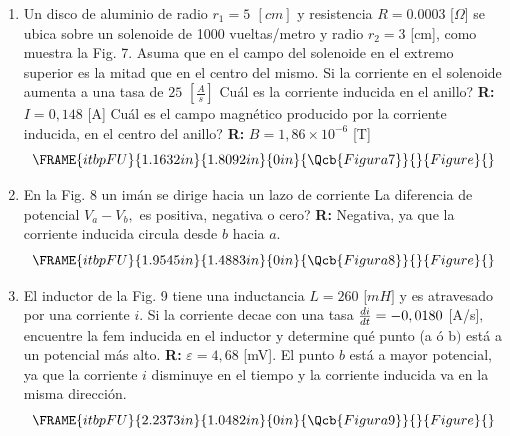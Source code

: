 \documentclass[12pt]{article}
\begin{document}
\begin{enumerate}
\item Un disco de aluminio de radio $r_{1}=5\,\ [cm]$ y resistencia $%
R=0.0003 $ [$\Omega $] se ubica sobre un solenoide de 1000 vueltas/metro y
radio $r_{2}=3$ [cm], como muestra la Fig. 7. Asuma que en el campo del
solenoide en el extremo superior es la mitad que en el centro del mismo. Si
la corriente en el solenoide aumenta a una tasa de $25$ $[\frac{A}{s}]$ 
\textquestiondown Cu\'{a}l es la corriente inducida en el anillo? \textbf{R: 
}$I=0,148$ [A] \textquestiondown Cu\'{a}l es el campo magn\'{e}tico
producido por la corriente inducida, en el centro del anillo? \textbf{R: }$%
B=1,86\times 10^{-6}$ [T]%
\begin{equation*}
\FRAME{itbpFU}{1.1632in}{1.8092in}{0in}{\Qcb{Figura 7}}{}{Figure}{\special%
{language "Scientific Word";type "GRAPHIC";maintain-aspect-ratio
TRUE;display "USEDEF";valid_file "T";width 1.1632in;height 1.8092in;depth
0in;original-width 3.5959in;original-height 5.6109in;cropleft "0";croptop
"1";cropright "1";cropbottom "0";tempfilename
'R45S6607.wmf';tempfile-properties "XPR";}}
\end{equation*}

\item En la Fig. 8 un im\'{a}n se dirige hacia un lazo de corriente 
\textquestiondown La diferencia de potencial $V_{a}-V_{b},$ es positiva,
negativa o cero? \textbf{R: }Negativa, ya que la corriente inducida circula
desde $b$ hacia $a.$%
\begin{equation*}
\FRAME{itbpFU}{1.9545in}{1.4883in}{0in}{\Qcb{Figura 8}}{}{Figure}{\special%
{language "Scientific Word";type "GRAPHIC";maintain-aspect-ratio
TRUE;display "USEDEF";valid_file "T";width 1.9545in;height 1.4883in;depth
0in;original-width 6.3728in;original-height 4.8473in;cropleft "0";croptop
"1";cropright "1";cropbottom "0";tempfilename
'R45S6608.wmf';tempfile-properties "XPR";}}
\end{equation*}

\item El inductor de la Fig. 9 tiene una inductancia $L=260$ [$mH]$ y es
atravesado por una corriente $i$. Si la corriente decae con una tasa $\frac{%
di}{dt}=-0,0180$ [A/s]$,$ encuentre la fem inducida en el inductor y
determine qu\'{e} punto (a \'{o} b$)$ est\'{a} a un potencial m\'{a}s alto. 
\textbf{R: }$\varepsilon =4,68$ [mV]$.$ El punto $b$ est\'{a} a mayor
potencial, ya que la corriente $i$ disminuye en el tiempo y la corriente
inducida va en la misma direcci\'{o}n.%
\begin{equation*}
\FRAME{itbpFU}{2.2373in}{1.0482in}{0in}{\Qcb{Figura 9}}{}{Figure}{\special%
{language "Scientific Word";type "GRAPHIC";maintain-aspect-ratio
TRUE;display "USEDEF";valid_file "T";width 2.2373in;height 1.0482in;depth
0in;original-width 3.4134in;original-height 1.5852in;cropleft "0";croptop
"1";cropright "1";cropbottom "0";tempfilename
'R45S7N0C.wmf';tempfile-properties "XPR";}}
\end{equation*}


\end{enumerate}
\end{document}
